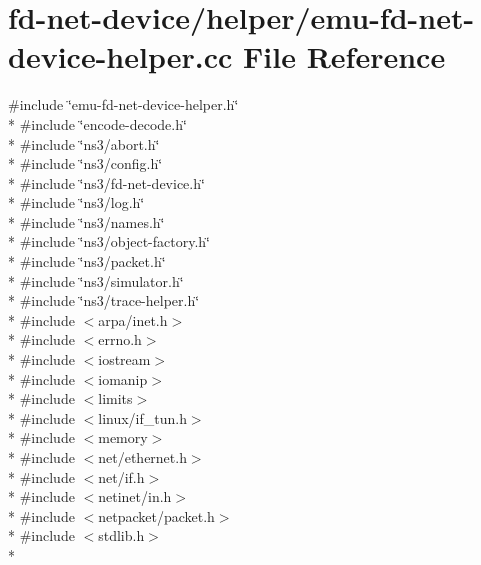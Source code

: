 \hypertarget{emu-fd-net-device-helper_8cc}{}\section{fd-\/net-\/device/helper/emu-\/fd-\/net-\/device-\/helper.cc File Reference}
\label{emu-fd-net-device-helper_8cc}
{\ttfamily \#include \char`\"{}emu-\/fd-\/net-\/device-\/helper.\+h\char`\"{}}\\*
{\ttfamily \#include \char`\"{}encode-\/decode.\+h\char`\"{}}\\*
{\ttfamily \#include \char`\"{}ns3/abort.\+h\char`\"{}}\\*
{\ttfamily \#include \char`\"{}ns3/config.\+h\char`\"{}}\\*
{\ttfamily \#include \char`\"{}ns3/fd-\/net-\/device.\+h\char`\"{}}\\*
{\ttfamily \#include \char`\"{}ns3/log.\+h\char`\"{}}\\*
{\ttfamily \#include \char`\"{}ns3/names.\+h\char`\"{}}\\*
{\ttfamily \#include \char`\"{}ns3/object-\/factory.\+h\char`\"{}}\\*
{\ttfamily \#include \char`\"{}ns3/packet.\+h\char`\"{}}\\*
{\ttfamily \#include \char`\"{}ns3/simulator.\+h\char`\"{}}\\*
{\ttfamily \#include \char`\"{}ns3/trace-\/helper.\+h\char`\"{}}\\*
{\ttfamily \#include $<$arpa/inet.\+h$>$}\\*
{\ttfamily \#include $<$errno.\+h$>$}\\*
{\ttfamily \#include $<$iostream$>$}\\*
{\ttfamily \#include $<$iomanip$>$}\\*
{\ttfamily \#include $<$limits$>$}\\*
{\ttfamily \#include $<$linux/if\+\_\+tun.\+h$>$}\\*
{\ttfamily \#include $<$memory$>$}\\*
{\ttfamily \#include $<$net/ethernet.\+h$>$}\\*
{\ttfamily \#include $<$net/if.\+h$>$}\\*
{\ttfamily \#include $<$netinet/in.\+h$>$}\\*
{\ttfamily \#include $<$netpacket/packet.\+h$>$}\\*
{\ttfamily \#include $<$stdlib.\+h$>$}\\*
